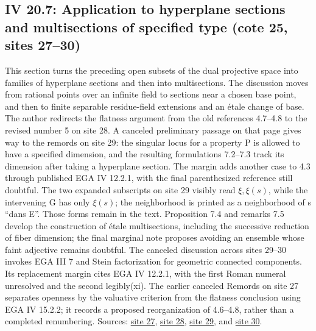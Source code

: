 \documentclass[10pt,a4paper]{article}
\begin{document}
\subsection*{IV 20.7: Application to hyperplane sections and multisections of specified type (cote 25, sites 27--30)}
This section turns the preceding open subsets of the dual projective space into families of hyperplane sections and then into multisections. The discussion moves from rational points over an infinite field to sections near a chosen base point, and then to finite separable residue-field extensions and an étale change of base. The author redirects the flatness argument from the old references 4.7--4.8 to the revised number 5 on site 28. A canceled preliminary passage on that page gives way to the remords on site 29: the singular locus for a property P is allowed to have a specified dimension, and the resulting formulations 7.2--7.3 track its dimension after taking a hyperplane section. The margin adds another case to 4.3 through published EGA IV 12.2.1, with the final parenthesized reference still doubtful. The two expanded subscripts on site 29 visibly read $\xi,\xi(s)$, while the intervening G has only $\xi(s)$; the neighborhood is printed as a neighborhood of s ``dans E''. Those forms remain in the text. Proposition 7.4 and remarks 7.5 develop the construction of étale multisections, including the successive reduction of fiber dimension; the final marginal note proposes avoiding an ensemble whose faint adjective remains doubtful. The canceled discussion across sites 29--30 invokes EGA III 7 and Stein factorization for geometric connected components. Its replacement margin cites EGA IV 12.2.1, with the first Roman numeral unresolved and the second legibly(xi). The earlier canceled Remords on site 27 separates openness by the valuative criterion from the flatness conclusion using EGA IV 15.2.2; it records a proposed reorganization of 4.6--4.8, rather than a completed renumbering. Sources: \href{https://grothendieck.umontpellier.fr/web/viewer.html?file=../25.pdf\#page=28}{site 27}, \href{https://grothendieck.umontpellier.fr/web/viewer.html?file=../25.pdf\#page=29}{site 28}, \href{https://grothendieck.umontpellier.fr/web/viewer.html?file=../25.pdf\#page=30}{site 29}, and \href{https://grothendieck.umontpellier.fr/web/viewer.html?file=../25.pdf\#page=31}{site 30}.
\par{}

\par{}
\end{document}
